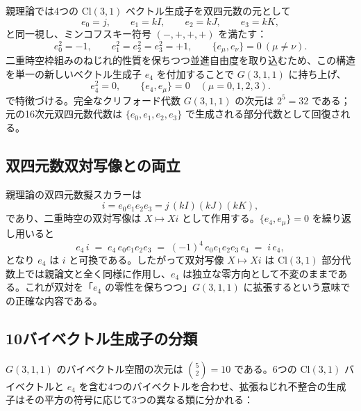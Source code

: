 \documentclass[dvipdfmx,11pt,a4paper]{article}
\theoremstyle{definition}
\theoremstyle{plain}
\theoremstyle{remark}
\begin{document}
親理論では4つの $\mathrm{Cl}(3,1)$ ベクトル生成子を双四元数の元として
\[
e_{0}=j,\qquad e_{1}=kI,\qquad e_{2}=kJ,\qquad e_{3}=kK,
\]
と同一視し、ミンコフスキー符号 $(-,+,+,+)$ を満たす：
\[
e_{0}^{2}=-1,\qquad e_{1}^{2}=e_{2}^{2}=e_{3}^{2}=+1,\qquad \{e_{\mu},e_{\nu}\}=0\ (\mu\neq\nu).
\]
二重時空枠組みのねじれ的性質を保ちつつ並進自由度を取り込むため、この構造を単一の新しいベクトル生成子 $e_{4}$ を付加することで $G(3,1,1)$ に持ち上げ、
\begin{equation}
e_{4}^{2}=0,\qquad \{e_{4},e_{\mu}\}=0\quad (\mu=0,1,2,3).
\label{eq:e4-defs}
\end{equation}
で特徴づける。完全なクリフォード代数 $G(3,1,1)$ の次元は $2^{5}=32$ である；元の16次元双四元数代数は $\{e_{0},e_{1},e_{2},e_{3}\}$ で生成される部分代数として回復される。

\subsection{双四元数双対写像との両立}

親理論の双四元数擬スカラーは
\[
i = e_{0}e_{1}e_{2}e_{3} = j\,(kI)(kJ)(kK),
\]
であり、二重時空の双対写像は $X\mapsto Xi$ として作用する。$\{e_{4},e_{\mu}\}=0$ を繰り返し用いると
\[
e_{4}\,i \;=\; e_{4}\,e_{0}e_{1}e_{2}e_{3} \;=\; (-1)^{4}\,e_{0}e_{1}e_{2}e_{3}\,e_{4} \;=\; i\,e_{4},
\]
となり $e_{4}$ は $i$ と可換である。したがって双対写像 $X\mapsto Xi$ は $\mathrm{Cl}(3,1)$ 部分代数上では親論文と全く同様に作用し、$e_{4}$ は独立な零方向として不変のままである。これが双対を「$e_{4}$ の零性を保ちつつ」$G(3,1,1)$ に拡張するという意味での正確な内容である。

\subsection{10バイベクトル生成子の分類}

$G(3,1,1)$ のバイベクトル空間の次元は $\binom{5}{2}=10$ である。6つの $\mathrm{Cl}(3,1)$ バイベクトルと $e_{4}$ を含む4つのバイベクトルを合わせ、拡張ねじれ不整合の生成子はその平方の符号に応じて3つの異なる類に分かれる：
\end{document}
